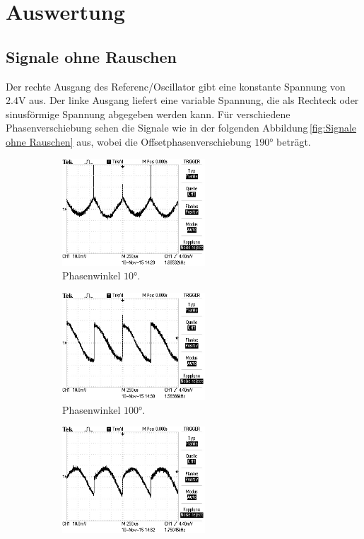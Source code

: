 \section{Auswertung}
\label{sec:Auswertung}
\subsection{Signale ohne Rauschen}
\label{sec:Signale ohne Rauschen}
Der rechte Ausgang des Referenc/Oscillator gibt eine konstante Spannung
von $2.4\si{\volt}$ aus. Der linke Ausgang liefert eine variable Spannung, die
als Rechteck oder sinusförmige Spannung abgegeben werden kann. Für verschiedene
Phasenverschiebung sehen die Signale wie in der folgenden
Abbildung\,\ref{fig:Signale ohne Rauschen} aus, wobei die Offsetphasenverschiebung
 $190°$ beträgt.
\begin{figure}
\centering
\begin{subfigure}{0.48\textwidth}
\centering
\includegraphics[height=4cm]{Bilder/or/or10.JPG}
\caption{Phasenwinkel $10°$.}
\label{fig:orp10}
\end{subfigure}
\begin{subfigure}{0.48\textwidth}
\centering
\includegraphics[height=4cm]{Bilder/or/or100.JPG}
\caption{Phasenwinkel $100°$.}
\label{fig:orp100}
\end{subfigure}
\begin{subfigure}{0.48\textwidth}
\centering
\includegraphics[height=4cm]{Bilder/or/or150.JPG}

\end{subfigure}
\end{figure}
